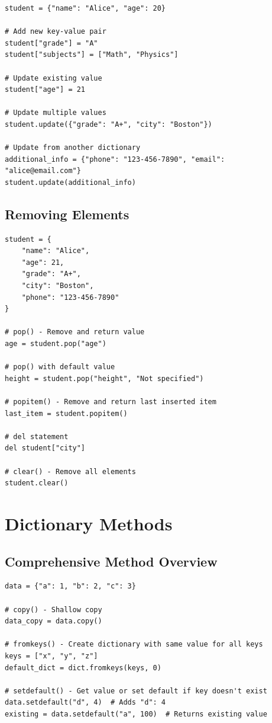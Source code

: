 \documentclass[12pt,a4paper]{article}
\begin{document}
\begin{lstlisting}
student = {"name": "Alice", "age": 20}

# Add new key-value pair
student["grade"] = "A"
student["subjects"] = ["Math", "Physics"]

# Update existing value
student["age"] = 21

# Update multiple values
student.update({"grade": "A+", "city": "Boston"})

# Update from another dictionary
additional_info = {"phone": "123-456-7890", "email": "alice@email.com"}
student.update(additional_info)
\end{lstlisting}

\subsection{Removing Elements}

\begin{lstlisting}
student = {
    "name": "Alice", 
    "age": 21, 
    "grade": "A+", 
    "city": "Boston",
    "phone": "123-456-7890"
}

# pop() - Remove and return value
age = student.pop("age")

# pop() with default value
height = student.pop("height", "Not specified")

# popitem() - Remove and return last inserted item
last_item = student.popitem()

# del statement
del student["city"]

# clear() - Remove all elements
student.clear()
\end{lstlisting}

\section{Dictionary Methods}

\subsection{Comprehensive Method Overview}

\begin{lstlisting}
data = {"a": 1, "b": 2, "c": 3}

# copy() - Shallow copy
data_copy = data.copy()

# fromkeys() - Create dictionary with same value for all keys
keys = ["x", "y", "z"]
default_dict = dict.fromkeys(keys, 0)

# setdefault() - Get value or set default if key doesn't exist
data.setdefault("d", 4)  # Adds "d": 4
existing = data.setdefault("a", 100)  # Returns existing value
\end{lstlisting}
\end{document}
